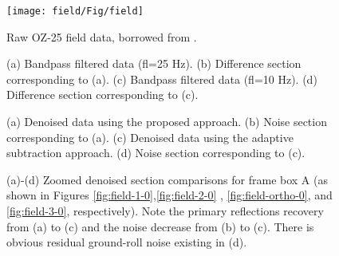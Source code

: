 \begin{figure}[htb!]
  \centering
    \texttt{[image: field/Fig/field]}
	\caption{Raw OZ-25 field data, borrowed from \cite{carson2006}.}
   \label{fig:field}
\end{figure}

\begin{figure}[htb!]
  \centering
	\caption{(a) Bandpass filtered data (fl=25 Hz). (b) Difference section corresponding to (a). (c) Bandpass filtered data (fl=10 Hz). (d) Difference section corresponding to (c).}
   \label{fig:field-1-0,dif-1-0,field-2-0,dif-2-0}
\end{figure}

\begin{figure}[htb!]
  \centering
	\caption{(a) Denoised data using the proposed approach. (b) Noise section corresponding to (a). (c) Denoised data using the adaptive subtraction approach. (d) Noise section corresponding to (c).}
   \label{fig:field-ortho-0,dif-ortho-0,field-3-0,dif-3-0}
\end{figure}

\begin{figure}[htb!]
  \centering
	\caption{(a)-(d) Zoomed denoised section comparisons for frame box A (as shown in Figures \ref{fig:field-1-0},\ref{fig:field-2-0} , \ref{fig:field-ortho-0}, and \ref{fig:field-3-0}, respectively). Note the primary reflections recovery from (a) to (c) and the noise decrease from (b) to (c). There is obvious residual ground-roll noise existing in (d).}
   \label{fig:zooma-1,zooma-2,zooma-ortho,zooma-3}
\end{figure}


